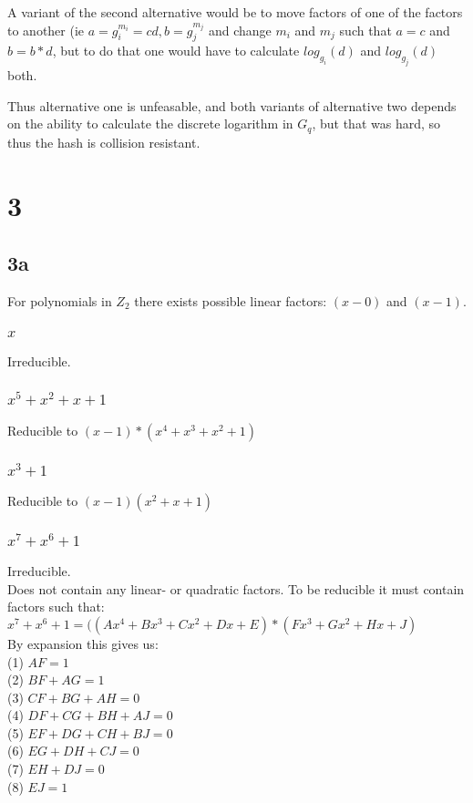 \documentclass[a4paper,11pt]{article}
\begin{document}
		A variant of the second alternative would be to move factors of one of the factors to another (ie $a = g_i^{m_i} = cd, b = g_j^{m_j}$ and
		change $m_i$ and $m_j$ such that $a = c$ and $b = b*d$, but to do that one would have to calculate $log_{g_i}(d)$ and $log_{g_j}(d)$ both.

		Thus alternative one is unfeasable, and both variants of alternative two depends on the ability to calculate the discrete logarithm
		in $G_q$, but that was hard, so thus the hash is collision resistant.

	\section*{3 }
		\subsection*{3a }
			For polynomials in $Z_2$ there exists possible linear factors: $(x-0)$ and $(x-1)$.

			\subsubsection*{$x$}
				Irreducible.
			\subsubsection*{$x^5 + x^2 + x + 1$}
				Reducible to $(x - 1)*(x^4 + x^3 + x^2 + 1)$
			\subsubsection*{$x^3 + 1$}
				Reducible to $(x - 1)(x^2 + x + 1)$
			\subsubsection*{$x^7 + x^6 + 1$}
				Irreducible.\\
				Does not contain any linear- or quadratic factors. To be reducible it must contain factors such that:\\
				$x^7 + x^6 + 1 = ((Ax^4 + Bx^3 + Cx^2 + Dx + E) * (Fx^3 + Gx^2 + Hx + J)$\\
				By expansion this gives us:\\
				(1) $AF = 1$\\
				(2) $BF + AG = 1$\\
				(3) $CF + BG + AH = 0$\\
				(4) $DF + CG + BH + AJ = 0$\\
				(5) $EF + DG + CH + BJ = 0$\\
				(6) $EG + DH + CJ = 0$\\
				(7) $EH + DJ = 0$\\
				(8) $EJ = 1$\\
			
\end{document}
